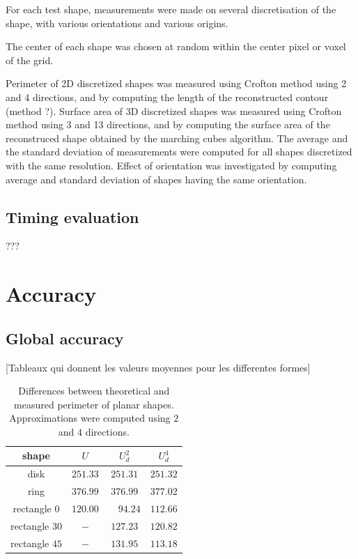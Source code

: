 \documentclass{InsightArticle}
\begin{document}
For each test shape, measurements were made on
several discretisation of the shape, with various orientations and various origins.

The center of each shape was chosen at random within the center pixel or voxel of the grid.

Perimeter of 2D discretized shapes was measured using Crofton method using 2 and 4 directions, 
and by computing the length of the reconstructed contour (method ?).
Surface area of 3D discretized shapes was measured using Crofton method using 3 and 13 directions, 
and by computing the surface area of the reconstruced shape obtained by the marching cubes algorithm.
The average and the standard deviation of measurements were computed for all shapes discretized
with the same resolution. Effect of orientation was investigated by computing average and standard 
deviation of shapes having the same orientation.

\subsection{Timing evaluation}

???

\section{Accuracy}

\subsection{Global accuracy}

[Tableaux qui donnent les valeurs moyennes pour les differentes formes]

%
\begin{table}[!htb]
\begin{center}
\begin{tabular}{|c|c|c|c|} \hline 
shape		    & $U$		& $U_d^2$ & $U_d^4$		\tabularnewline \hline
disk		    & $251.33$	& $251.31$ 	& $251.32$ 	\tabularnewline
ring		    & $376.99$	& $376.99$ 	& $377.02$	\tabularnewline
rectangle  $0$ 	& $120.00$ 	&\ \ $94.24$& $112.66$	\tabularnewline
rectangle $30$  & $-$ 		& $127.23$	& $120.82$	\tabularnewline
rectangle $45$  & $-$ 		& $131.95$	& $113.18$	\tabularnewline
\hline
\end{tabular}\end{center}
\caption{\label{tab:Validate-Perimeter}
Differences between theoretical and measured perimeter of planar shapes.
Approximations were computed using $2$ and $4$ directions.
}
\end{table}
\end{document}
